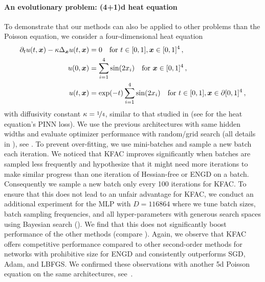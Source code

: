 \paragraph{An evolutionary problem: (4+1)d heat equation}
To demonstrate that our methods can also be applied to other problems than the Poisson equation, we consider a four-dimensional heat equation
\begin{align}\label{eq:4D-heat}
  \begin{split}
    \partial_t u(t,{\bm{x}})-\kappa\Delta_{\bm{x}} u(t,{\bm{x}})
    &=
      0 \quad \text{for } t\in[0,1], {\bm{x}}\in [0,1]^{4}\,,
    \\
    u(0,{\bm{x}})
    &=
      \sum_{i=1}^{4} \sin(2 x_i) \quad \text{for }
      {\bm{x}}\in [0,1]^{4}\,,
    \\
    u(t,{\bm{x}})
    &=
      \exp(-t) \sum_{i=1}^{4} \sin(2 x_i) \quad \text{for } t\in[0,1], {\bm{x}}\in\partial[0,1]^{4}\,,
  \end{split}
\end{align}
with diffusivity constant $\kappa = \nicefrac{1}{4}$, similar to that studied in \cite{muller2023achieving} (see  for the heat equation's PINN loss).
We use the previous architectures with same hidden widths and evaluate optimizer performance with random/grid search (all details in ), see .
To prevent over-fitting, we use mini-batches and sample a new batch each iteration.
We noticed that KFAC improves significantly when batches are sampled less frequently and hypothesize that it might need more iterations to make similar progress than one iteration of Hessian-free or ENGD on a batch.
Consequently we sample a new batch only every 100 iterations for KFAC.
To ensure that this does not lead to an unfair advantage for KFAC, we conduct an additional experiment for the MLP with $D=\num{116864}$ where we tune batch sizes, batch sampling frequencies, and all hyper-parameters with generous search spaces using Bayesian search ().
We find that this does not significantly boost performance of the other methods (compare ).
Again, we observe that KFAC offers competitive performance compared to other second-order methods for networks with prohibitive size for ENGD and consistently outperforms SGD, Adam, and LBFGS.
We confirmed these observations with another 5d Poisson equation on the same architectures, see~.

